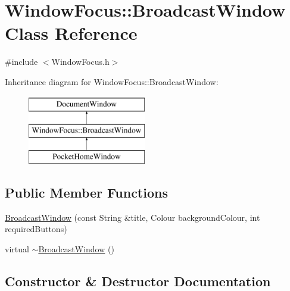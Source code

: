 \hypertarget{classWindowFocus_1_1BroadcastWindow}{}\section{Window\+Focus\+:\+:Broadcast\+Window Class Reference}
\label{classWindowFocus_1_1BroadcastWindow}


{\ttfamily \#include $<$Window\+Focus.\+h$>$}

Inheritance diagram for Window\+Focus\+:\+:Broadcast\+Window\+:\begin{figure}[H]
\begin{center}
\leavevmode
\includegraphics[height=3.000000cm]{classWindowFocus_1_1BroadcastWindow}
\end{center}
\end{figure}
\subsection*{Public Member Functions}
\begin{DoxyCompactItemize}
\item 
\mbox{\hyperlink{classWindowFocus_1_1BroadcastWindow_aa9cc58eee362227c3d1974374b23232c}{Broadcast\+Window}} (const String \&title, Colour background\+Colour, int required\+Buttons)
\item 
virtual \mbox{\hyperlink{classWindowFocus_1_1BroadcastWindow_a6220230c3bfbe99f43edac70ec88127b}{$\sim$\+Broadcast\+Window}} ()
\end{DoxyCompactItemize}


\subsection{Constructor \& Destructor Documentation}
\mbox{\label{classWindowFocus_1_1BroadcastWindow_aa9cc58eee362227c3d1974374b23232c}} 
